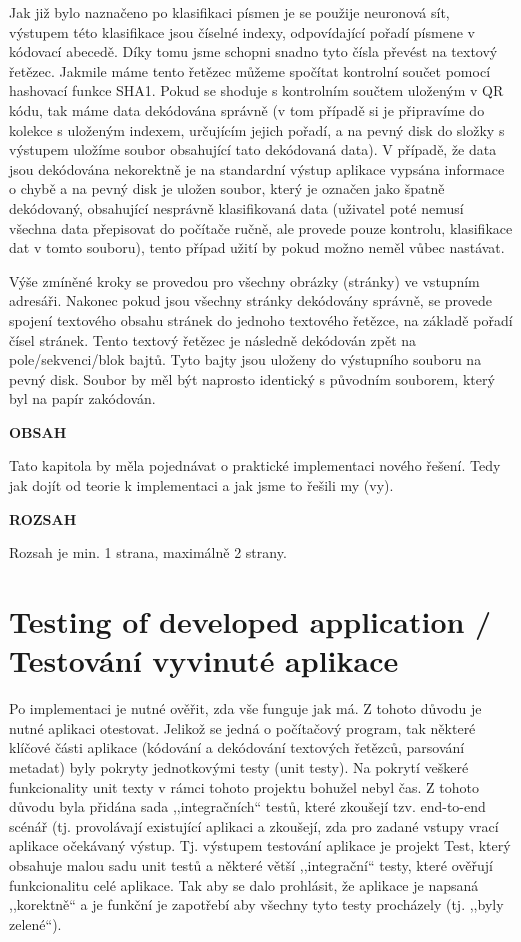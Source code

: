 \documentclass[conference]{IEEEtran}
\begin{document}
Jak již bylo naznačeno po klasifikaci písmen je se použije neuronová sít, výstupem této klasifikace jsou číselné indexy, odpovídající pořadí písmene v kódovací abecedě. Díky tomu jsme schopni snadno tyto čísla převést na textový řetězec. Jakmile máme tento řetězec můžeme spočítat kontrolní součet pomocí hashovací funkce SHA1. Pokud se shoduje s kontrolním součtem uloženým v QR kódu, tak máme data dekódována správně (v tom případě si je připravíme do kolekce s uloženým indexem, určujícím jejich pořadí, a na pevný disk do složky s výstupem uložíme soubor obsahující tato dekódovaná data). V případě, že data jsou dekódována nekorektně je na standardní výstup aplikace vypsána informace o chybě a na pevný disk je uložen soubor, který je označen jako špatně dekódovaný, obsahující nesprávně klasifikovaná data (uživatel poté nemusí všechna data přepisovat do počítače ručně, ale provede pouze kontrolu, klasifikace dat v tomto souboru), tento případ užití by pokud možno neměl vůbec nastávat.

Výše zmíněné kroky se provedou pro všechny obrázky (stránky) ve vstupním adresáři. Nakonec pokud jsou všechny stránky dekódovány správně, se provede spojení textového obsahu stránek do jednoho textového řetězce, na základě pořadí čísel stránek. Tento textový řetězec je následně dekódován zpět na pole/sekvenci/blok bajtů. Tyto bajty jsou uloženy do výstupního souboru na pevný disk. Soubor by měl být naprosto identický s původním souborem, který byl na papír zakódován.

\textbf{OBSAH}

Tato kapitola by měla pojednávat o praktické implementaci nového řešení. Tedy jak dojít od teorie k implementaci a jak jsme to řešili my (vy).

\textbf{ROZSAH}

Rozsah je min. 1 strana, maximálně 2 strany.

\section{Testing of developed application / Testování vyvinuté aplikace}

Po implementaci je nutné ověřit, zda vše funguje jak má. Z tohoto důvodu je nutné aplikaci otestovat. Jelikož se jedná o počítačový program, tak některé klíčové části aplikace (kódování a dekódování textových řetězců, parsování metadat) byly pokryty jednotkovými testy (unit testy). Na pokrytí veškeré funkcionality unit texty v rámci tohoto projektu bohužel nebyl čas. Z tohoto důvodu byla přidána sada ,,integračních`` testů, které zkoušejí tzv. end-to-end scénář (tj. provolávají existující aplikaci a zkoušejí, zda pro zadané vstupy vrací aplikace očekávaný výstup. Tj. výstupem testování aplikace je projekt Test, který obsahuje malou sadu unit testů a některé větší ,,integrační`` testy, které ověřují funkcionalitu celé aplikace. Tak aby se dalo prohlásit, že aplikace je napsaná ,,korektně`` a je funkční je zapotřebí aby všechny tyto testy procházely (tj. ,,byly zelené``).
\end{document}

